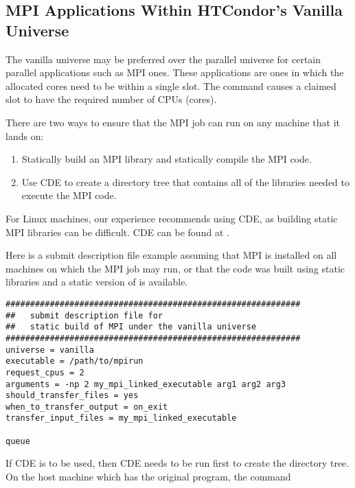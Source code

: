 
\subsection{\label{sec:parallel-mpi-submit-single}MPI Applications Within HTCondor's Vanilla Universe}

The vanilla universe may be preferred over the parallel universe
for certain parallel applications such as MPI ones.
These applications are ones in which the allocated cores need
to be within a single slot.
The  command causes a claimed slot to
have the required number of CPUs (cores).

There are two ways to ensure that the MPI job can run 
on any machine that it lands on:
\begin{enumerate}
\item Statically build an MPI library and statically compile the MPI code.
\item Use CDE to create a directory tree that contains all of the libraries 
needed to execute the MPI code.
\end{enumerate}

For Linux machines, our experience recommends using CDE,
as building static MPI libraries can be difficult.
CDE can be found at .

Here is a submit description file example assuming that
MPI is installed on all machines on which the MPI job
may run, 
or that the code was built using static libraries and a static version of 
 is available.

\footnotesize
\begin{verbatim}
############################################################
##   submit description file for 
##   static build of MPI under the vanilla universe
############################################################
universe = vanilla
executable = /path/to/mpirun
request_cpus = 2
arguments = -np 2 my_mpi_linked_executable arg1 arg2 arg3
should_transfer_files = yes
when_to_transfer_output = on_exit
transfer_input_files = my_mpi_linked_executable

queue
\end{verbatim}
\normalsize

If CDE is to be used,
then CDE needs to be run first to create the directory tree. 
On the host machine which has the original program, the command

